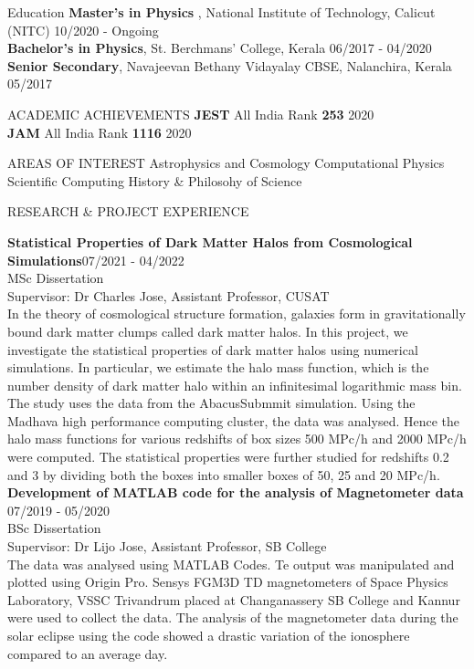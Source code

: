 \documentclass{resume} %
\begin{document}
\begin{rSection}{Education}
{\bf Master's in Physics }, National Institute of Technology, Calicut (NITC) \hfill {10/2020 - Ongoing} \\
{\bf Bachelor’s in Physics}, St. Berchmans’ College, Kerala \hfill {06/2017 - 04/2020}\\
{\bf Senior Secondary}, Navajeevan Bethany Vidayalay CBSE, Nalanchira, Kerala \hfill {05/2017}
\end{rSection}

\begin{rSection}{ACADEMIC ACHIEVEMENTS}
\textbf{JEST} All India Rank \textbf{253} \hfill 2020 \\
\textbf{JAM} All India Rank \textbf{1116} \hfill 2020

\end{rSection}

\begin{rSection}{AREAS OF INTEREST }
Astrophysics and Cosmology \textbar{} Computational Physics  \textbar{} Scientific Computing \textbar{} History \& Philosohy of Science
\end{rSection}

\begin{rSection}{RESEARCH \& PROJECT EXPERIENCE}


\textbf {Statistical Properties of Dark Matter Halos from Cosmological Simulations}\hfill 07/2021 - 04/2022 \\ 
MSc Dissertation \\
Supervisor: Dr Charles Jose, Assistant Professor, CUSAT \\
In the theory of cosmological structure formation, galaxies form in gravitationally bound dark matter clumps called dark matter halos. In this project, we investigate the statistical properties of dark matter halos using numerical simulations. In particular, we estimate the halo mass function, which is the number density of dark matter halo within an infinitesimal logarithmic mass bin. The study uses the data from the AbacusSubmmit simulation. Using the Madhava high performance computing cluster, the data was analysed. Hence the halo mass functions for various redshifts of box sizes 500 MPc/h and 2000 MPc/h were computed. The statistical properties were further studied for redshifts 0.2 and 3 by dividing both the boxes into smaller boxes of 50, 25 and 20 MPc/h. \\


\textbf {Development of MATLAB code for the analysis of Magnetometer data}  \hfill 07/2019 - 05/2020 \\ 
BSc Dissertation\\
Supervisor: Dr Lijo Jose, Assistant Professor, SB College \\ 
The data was analysed using MATLAB Codes. Te output was manipulated and plotted using Origin Pro. Sensys FGM3D TD magnetometers of Space Physics Laboratory, VSSC Trivandrum placed at Changanassery SB College and Kannur were used to collect the data. The analysis of the magnetometer data during the solar eclipse using the code showed a drastic variation of the ionosphere compared to an average day. 
\end{rSection} 
\end{document}
